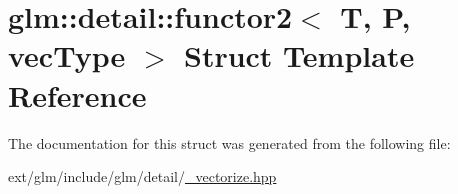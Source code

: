 \hypertarget{structglm_1_1detail_1_1functor2}{\section{glm\-:\-:detail\-:\-:functor2$<$ T, P, vec\-Type $>$ Struct Template Reference}
\label{structglm_1_1detail_1_1functor2}
}


The documentation for this struct was generated from the following file\-:\begin{DoxyCompactItemize}
\item 
ext/glm/include/glm/detail/\hyperlink{__vectorize_8hpp}{\-\_\-vectorize.\-hpp}\end{DoxyCompactItemize}
